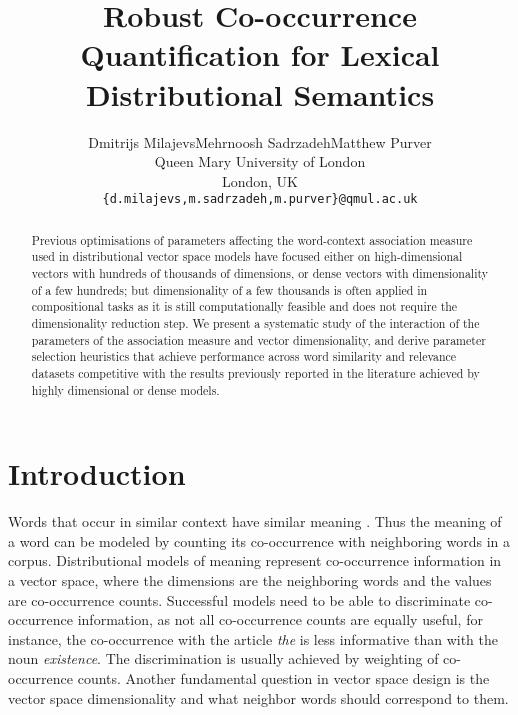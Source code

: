 \documentclass[11pt]{article}
\title{Robust Co-occurrence Quantification for Lexical Distributional Semantics}
\author{Dmitrijs Milajevs\qquad{}Mehrnoosh Sadrzadeh\qquad{}Matthew Purver\\
  Queen Mary University of London\\
  London, UK\\
  {\tt \{d.milajevs,m.sadrzadeh,m.purver\}@qmul.ac.uk}
}
\date{}
\begin{document}
\def\PMI/{$\operatorname{1PMI}$}
\def\SPMI/{$\operatorname{1SPMI}$}
\def\CPMI/{$\operatorname{1CPMI}$}
\def\SCPMI/{$\operatorname{1SCPMI}$}

\def\NPMI/{$\operatorname{nPMI}$}
\def\NSPMI/{$\operatorname{nSPMI}$}
\def\NCPMI/{$\operatorname{nCPMI}$}
\def\NSCPMI/{$\operatorname{nSCPMI}$}

\def\logNPMI/{$\operatorname{lognPMI}$}
\def\logNSPMI/{$\operatorname{lognSPMI}$}
\def\logNCPMI/{$\operatorname{lognCPMI}$}
\def\logNSCPMI/{$\operatorname{lognSCPMI}$}

\maketitle
\begin{abstract}
Previous optimisations of parameters affecting the word-context association measure used in distributional vector space models have focused either on high-dimensional vectors with hundreds of thousands of dimensions, or dense vectors with dimensionality of a few hundreds; but dimensionality of a few thousands is often applied in compositional tasks as it is still computationally feasible and does not require the dimensionality reduction step. We present a systematic study of the interaction of the parameters of the association measure and vector dimensionality, and derive parameter selection heuristics that achieve performance across word similarity and relevance datasets competitive with the results previously reported in the literature achieved by highly dimensional or dense models.
\end{abstract}

\section{Introduction}
\label{sec:introduction}

Words that occur in similar context have similar meaning \cite{harris1954distributional}. Thus the meaning of a word can be modeled by counting its co-occurrence with neighboring words in a corpus. Distributional models of meaning represent co-occurrence information in a vector space, where the dimensions are the neighboring words and the values are co-occurrence counts. Successful models need to be able to discriminate co-occurrence information, as not all co-occurrence counts are equally useful, for instance, the co-occurrence with the article \textit{the} is less informative than with the noun \textit{existence}. The discrimination is usually achieved by weighting of co-occurrence counts. Another fundamental question in vector space design is the vector space dimensionality and what neighbor words should correspond to them.
\end{document}
